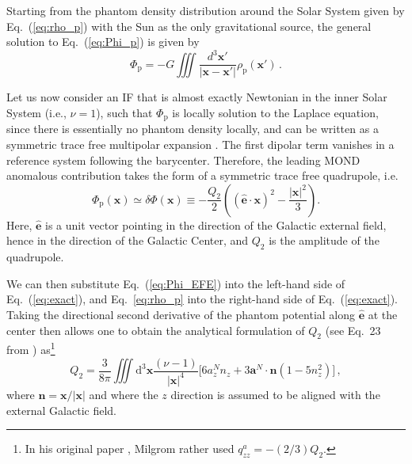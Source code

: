 \documentclass[reprint,nofootinbib,prd,aps]{revtex4-2}
\begin{document}
Starting from the phantom density distribution around the Solar System given by Eq.~(\ref{eq:rho_p}) with the Sun as the only gravitational source, the general solution to Eq.~(\ref{eq:Phi_p}) is given by
\begin{equation}
\label{eq:exact}
    \Phi_\mathrm{p} = -G\iiint \frac{d^3\bm x'}{\left|\bm x-\bm x'\right|} \rho_\mathrm{p}(\bm x') \, .
\end{equation}

Let us now consider an IF that is almost exactly Newtonian in the inner Solar System (i.e., $\nu = 1$), such that $\Phi_\mathrm{p}$ is locally solution to the Laplace equation, since there is essentially no phantom density locally, and can be written as a symmetric trace free multipolar expansion \cite{milgrom:2009vn}. The first dipolar term vanishes in a reference system following the barycenter. Therefore, the leading MOND anomalous contribution takes the form of a symmetric trace free quadrupole, i.e. 
\begin{equation}\label{eq:Phi_EFE}
\Phi_\mathrm{p}(\bm x) \simeq \delta \Phi(\bm x) \equiv - \frac{Q_2}{2} \left( \left(\hat {\bm e}\cdot \bm x\right)^2 - \frac{\left|\bm x\right|^2}{3} \right).
\end{equation}
Here, $\hat {\bm e}$ is a unit vector pointing in the direction of the Galactic external field, hence in the direction of the Galactic Center, and $Q_2$ is the amplitude of the quadrupole. 

We can then substitute Eq.~(\ref{eq:Phi_EFE}) into the left-hand side of Eq.~(\ref{eq:exact}), and Eq.~\eqref{eq:rho_p} into the right-hand side of Eq.~(\ref{eq:exact}). Taking the directional second derivative of the phantom potential along $\hat {\bm e}$ at the center then allows one to obtain the analytical formulation of $Q_2$  (see Eq.~23 from \cite{milgrom:2009vn}) as\footnote{In his original paper \cite{milgrom:2009vn}, Milgrom rather used $q_{zz}^a = -(2/3)Q_2$.}
\begin{equation}\label{eq:q_general}
    Q_2=\frac{3}{8\pi}\iiint \mathrm{d}^3\bm x \frac{\left(\nu -1\right)}{\left|\bm x\right|^4} \Big[6a_z^N n_z+3\bm a^N \cdot \bm n (1-5n_z^2)\Big] \, ,
\end{equation}
where $\bm n=\bm x/\left|\bm x\right|$ and where the $z$ direction is assumed to be aligned with the external Galactic field.
\end{document}
